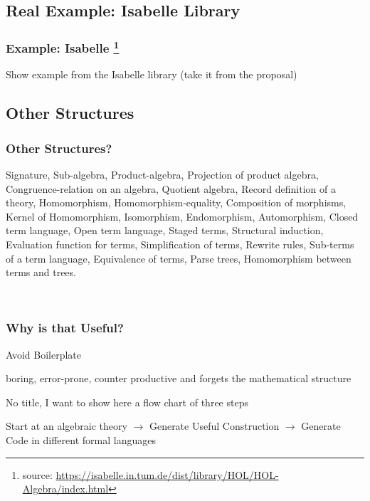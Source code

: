 \documentclass[t,12pt,numbers,fleqn,usenames,xcolor=dvipsnames]{beamer}
\begin{document}
\subsection{Real Example: Isabelle Library}
\begin{frame}
\frametitle{Example: Isabelle \footnote{source: \url{https://isabelle.in.tum.de/dist/library/HOL/HOL-Algebra/index.html}}}
Show example from the Isabelle library (take it from the proposal)
\end{frame}

\subsection{Other Structures}
\begin{frame}
\frametitle{Other Structures?}
\vspace{0.15cm}
{\scriptsize
	Signature, Sub-algebra, Product-algebra, Projection of product algebra, Congruence-relation on 
	an algebra, Quotient algebra, Record definition of a theory, Homomorphism, 
	Homomorphism-equality, Composition of morphisms, Kernel of Homomorphism, Isomorphism, 
	Endomorphism, Automorphism, Closed term language, Open term language, Staged terms, 
	Structural induction, Evaluation function for terms, Simplification of terms, Rewrite rules, 
	Sub-terms of a term language, Equivalence of terms, Parse trees, Homomorphism between 
	terms and trees. 
}

\vspace{0.3cm}
\pause
{}
\
\end{frame}

\begin{frame}
\frametitle{Why is that Useful?}
Avoid Boilerplate 

boring, error-prone, counter productive and forgets the 
	mathematical structure
\end{frame}

\begin{frame}
No title, I want to show here a flow chart of three steps 

Start at an algebraic theory $\rightarrow$ Generate Useful Construction $\rightarrow$ Generate 
Code in different formal languages 
\end{frame}
\end{document}
